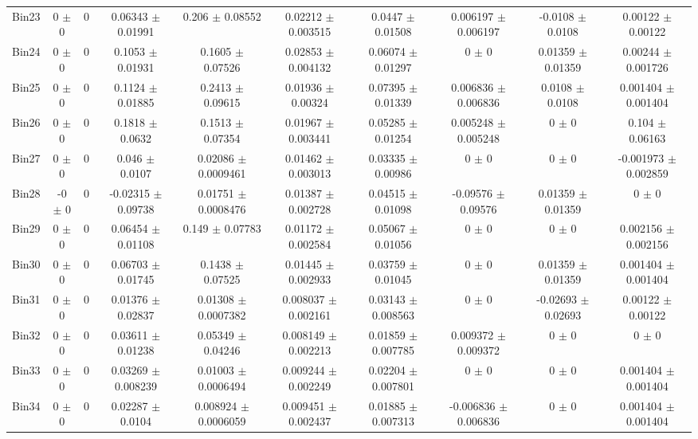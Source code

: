 \begin{tabular}{@{\extracolsep{4pt}}lccccccccc@{}}
     Bin23 & 0 $\pm$ 0 & 0 & 0.06343 $\pm$ 0.01991 & 0.206 $\pm$ 0.08552 & 0.02212 $\pm$ 0.003515 & 0.0447 $\pm$ 0.01508 & 0.006197 $\pm$ 0.006197 & -0.0108 $\pm$ 0.0108 & 0.00122 $\pm$ 0.00122 \\ 
     Bin24 & 0 $\pm$ 0 & 0 & 0.1053 $\pm$ 0.01931 & 0.1605 $\pm$ 0.07526 & 0.02853 $\pm$ 0.004132 & 0.06074 $\pm$ 0.01297 & 0 $\pm$ 0 & 0.01359 $\pm$ 0.01359 & 0.00244 $\pm$ 0.001726 \\ 
     Bin25 & 0 $\pm$ 0 & 0 & 0.1124 $\pm$ 0.01885 & 0.2413 $\pm$ 0.09615 & 0.01936 $\pm$ 0.00324 & 0.07395 $\pm$ 0.01339 & 0.006836 $\pm$ 0.006836 & 0.0108 $\pm$ 0.0108 & 0.001404 $\pm$ 0.001404 \\ 
     Bin26 & 0 $\pm$ 0 & 0 & 0.1818 $\pm$ 0.0632 & 0.1513 $\pm$ 0.07354 & 0.01967 $\pm$ 0.003441 & 0.05285 $\pm$ 0.01254 & 0.005248 $\pm$ 0.005248 & 0 $\pm$ 0 & 0.104 $\pm$ 0.06163 \\ 
     Bin27 & 0 $\pm$ 0 & 0 & 0.046 $\pm$ 0.0107 & 0.02086 $\pm$ 0.0009461 & 0.01462 $\pm$ 0.003013 & 0.03335 $\pm$ 0.00986 & 0 $\pm$ 0 & 0 $\pm$ 0 & -0.001973 $\pm$ 0.002859 \\ 
     Bin28 & -0 $\pm$ 0 & 0 & -0.02315 $\pm$ 0.09738 & 0.01751 $\pm$ 0.0008476 & 0.01387 $\pm$ 0.002728 & 0.04515 $\pm$ 0.01098 & -0.09576 $\pm$ 0.09576 & 0.01359 $\pm$ 0.01359 & 0 $\pm$ 0 \\ 
     Bin29 & 0 $\pm$ 0 & 0 & 0.06454 $\pm$ 0.01108 & 0.149 $\pm$ 0.07783 & 0.01172 $\pm$ 0.002584 & 0.05067 $\pm$ 0.01056 & 0 $\pm$ 0 & 0 $\pm$ 0 & 0.002156 $\pm$ 0.002156 \\ 
     Bin30 & 0 $\pm$ 0 & 0 & 0.06703 $\pm$ 0.01745 & 0.1438 $\pm$ 0.07525 & 0.01445 $\pm$ 0.002933 & 0.03759 $\pm$ 0.01045 & 0 $\pm$ 0 & 0.01359 $\pm$ 0.01359 & 0.001404 $\pm$ 0.001404 \\ 
     Bin31 & 0 $\pm$ 0 & 0 & 0.01376 $\pm$ 0.02837 & 0.01308 $\pm$ 0.0007382 & 0.008037 $\pm$ 0.002161 & 0.03143 $\pm$ 0.008563 & 0 $\pm$ 0 & -0.02693 $\pm$ 0.02693 & 0.00122 $\pm$ 0.00122 \\ 
     Bin32 & 0 $\pm$ 0 & 0 & 0.03611 $\pm$ 0.01238 & 0.05349 $\pm$ 0.04246 & 0.008149 $\pm$ 0.002213 & 0.01859 $\pm$ 0.007785 & 0.009372 $\pm$ 0.009372 & 0 $\pm$ 0 & 0 $\pm$ 0 \\ 
     Bin33 & 0 $\pm$ 0 & 0 & 0.03269 $\pm$ 0.008239 & 0.01003 $\pm$ 0.0006494 & 0.009244 $\pm$ 0.002249 & 0.02204 $\pm$ 0.007801 & 0 $\pm$ 0 & 0 $\pm$ 0 & 0.001404 $\pm$ 0.001404 \\ 
     Bin34 & 0 $\pm$ 0 & 0 & 0.02287 $\pm$ 0.0104 & 0.008924 $\pm$ 0.0006059 & 0.009451 $\pm$ 0.002437 & 0.01885 $\pm$ 0.007313 & -0.006836 $\pm$ 0.006836 & 0 $\pm$ 0 & 0.001404 $\pm$ 0.001404 \\ 

\end{tabular}
